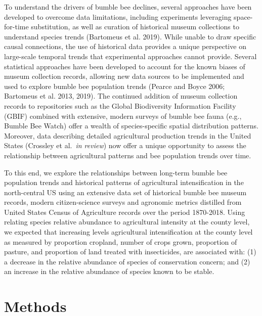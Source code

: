 \documentclass[11pt,]{article}
\begin{document}
To understand the drivers of bumble bee declines, several approaches
have been developed to overcome data limitations, including experiments
leveraging space-for-time substitution, as well as curation of
historical museum collections to understand species trends (Bartomeus et
al. 2019). While unable to draw specific causal connections, the use of
historical data provides a unique perspective on large-scale temporal
trends that experimental approaches cannot provide. Several statistical
approaches have been developed to account for the known biases of museum
collection records, allowing new data sources to be implemented and used
to explore bumble bee population trends (Pearce and Boyce 2006;
Bartomeus et al. 2013, 2019). The continued addition of museum
collection records to repositories such as the Global Biodiversity
Information Facility (GBIF) combined with extensive, modern surveys of
bumble bee fauna (e.g., Bumble Bee Watch) offer a wealth of
species-specific spatial distribution patterns. Moreover, data
describing detailed agricultural production trends in the United States
(Crossley et al.~\emph{in review}) now offer a unique opportunity to
assess the relationship between agricultural patterns and bee population
trends over time.

To this end, we explore the relationships between long-term bumble bee
population trends and historical patterns of agricultural
intensification in the north-central US using an extensive data set of
historical bumble bee museum records, modern citizen-science surveys and
agronomic metrics distilled from United States Census of Agriculture
records over the period 1870-2018. Using relating species relative
abundance to agricultural intensity at the county level, we expected
that increasing levels agricultural intensification at the county level
as measured by proportion cropland, number of crops grown, proportion of
pasture, and proportion of land treated with insecticides, are
associated with: (1) a decrease in the relative abundance of species of
conservation concern; and (2) an increase in the relative abundance of
species known to be stable.

\hypertarget{methods}{%
\section{Methods}\label{methods}}
\end{document}
